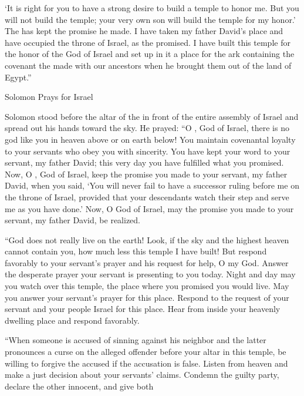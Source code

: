 {‘It is right
for
you to have
a strong desire
to build
a temple
to honor me.
But
you
will not
build
the temple;
your very own
son
will build
the temple
for my honor.’
The
{}
has kept
the promise
he made. I have
taken my father
David’s
place
and have occupied
the throne
of Israel,
as
the {}
promised.
I have built
this temple
for the honor
of the {}
God
of Israel
and set
up in it a place
for the ark
containing
the covenant
the {}
made
with
our ancestors
when he brought them out
of the
land
of Egypt.”
\par }{\SH Solomon Prays for Israel
\par }{\PP {}Solomon
stood
before
the altar
of the {}
in front
of the entire
assembly
of Israel
and spread
out his hands
toward the sky.
He prayed: “O
{},
God
of Israel,
there is no
god
like
you in heaven
above
or on
earth
below! You maintain
covenantal
loyalty
to your servants
who obey
you with sincerity.
You have
kept
your word to your servant,
my father
David;
this
very day
you have
fulfilled
what
you promised.
Now,
O
{},
God
of Israel,
keep
the promise you made to your servant,
my father
David,
when
you said,
‘You will never
fail
to have a successor
ruling
before
me on
the throne
of Israel,
provided
that your descendants
watch
their step
and serve me
as
you have
done.’
Now,
O God
of Israel,
may the promise you made
to your servant,
my father
David,
be realized.
\par }{\PP {}“God
does not really
live
on
the earth! Look,
if the sky
and the highest
heaven
cannot
contain
you, how much
less
this
temple
I have
built!
But
respond favorably
to your servant’s
prayer
and his request for help,
O
{}
my God.
Answer the desperate
prayer
your servant
is presenting
to you today.
Night
and day
may
you watch
over
this
temple,
the place
where
you promised
you would live.
May you answer
your servant’s
prayer
for
this
place.
Respond
to
the request
of your servant
and your people
Israel
for this
place.
Hear
from
inside your heavenly
dwelling
place
and respond
favorably.
\par }{\PP {}“When
someone
is accused of sinning
against his neighbor
and the latter pronounces
a curse
on the alleged
offender before
your altar
in this temple, be willing to forgive the accused if the accusation is false.
Listen
from heaven
and make
a just decision
about your servants’
claims. Condemn
the guilty
party,
declare
the other innocent,
and give
both
}
